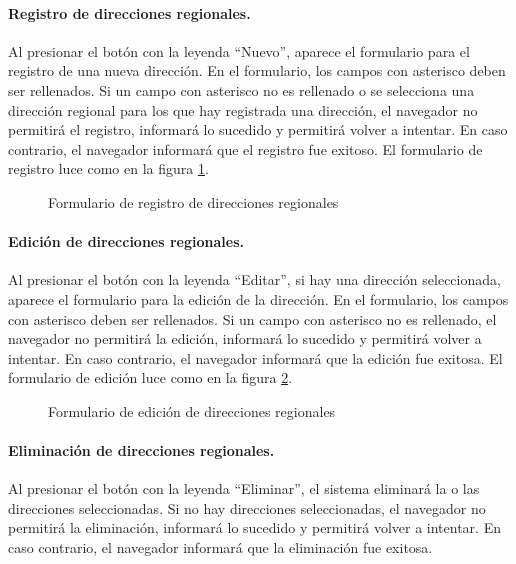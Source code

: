 \documentclass[a4paper, 9pt, conference]{article}              %
\begin{document}
\paragraph{Registro de direcciones regionales.}

Al presionar el bot\'on con la leyenda ``Nuevo'', aparece el formulario para el registro de una nueva direcci\'on. En el formulario, los campos con asterisco deben ser rellenados. Si un campo con asterisco no es rellenado o se selecciona una direcci\'on regional para los que hay registrada una direcci\'on, el navegador no permitir\'a el registro, informar\'a lo sucedido y permitir\'a volver a intentar. En caso contrario, el navegador informar\'a que el registro fue exitoso. El formulario de registro luce como en la figura \ref{fig:georegionalsnew}.

\begin{figure}
	\centering
		\caption{Formulario de registro de direcciones regionales}
	\label{fig:georegionalsnew}
\end{figure}

\paragraph{Edici\'on de direcciones regionales.}

Al presionar el bot\'on con la leyenda ``Editar'', si hay una direcci\'on seleccionada, aparece el formulario para la edici\'on de la direcci\'on. En el formulario, los campos con asterisco deben ser rellenados. Si un campo con asterisco no es rellenado, el navegador no permitir\'a la edici\'on, informar\'a lo sucedido y permitir\'a volver a intentar. En caso contrario, el navegador informar\'a que la edici\'on fue exitosa. El formulario de edici\'on luce como en la figura \ref{fig:georegionalsedit}.

\begin{figure}
	\centering
		\caption{Formulario de edici\'on de direcciones regionales}
	\label{fig:georegionalsedit}
\end{figure}

\paragraph{Eliminaci\'on de direcciones regionales.}

Al presionar el bot\'on con la leyenda ``Eliminar'', el sistema eliminar\'a la o las direcciones seleccionadas. Si no hay direcciones seleccionadas, el navegador no permitir\'a la eliminaci\'on, informar\'a lo sucedido y permitir\'a volver a intentar. En caso contrario, el navegador informar\'a que la eliminaci\'on fue exitosa.
\end{document}
